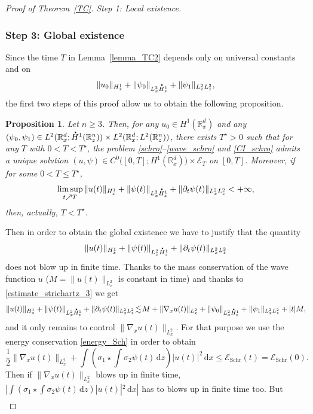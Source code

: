 \documentclass[10pt]{amsart}
\newtheorem{proposition}[lemma]{Proposition}
\theoremstyle{definition}
\newcommand*{\overbigdot}[1]{%
\accentset{\mbox{\large\bfseries .}}{#1}}
\newenvironment{ProofOf}[1]{\begin{proof}[Proof of #1]}{\end{proof}}
\newcommand{\R}{\mathbb{R}}
\newcommand{\ud}{\, {\mathrm{d}}}
\begin{document}
\begin{ProofOf}{Theorem~\ref{TC}. Step 1: Local existence}
\subsubsection*{Step 3: Global existence} Since the time $T$ in Lemma~\ref{lemma_TC2} depends only on universal constants and on\vspace*{-3pt}
\[
\|u_{0}\|_{H_{x}^{1}}+\|\psi_{0}\|_{L_{x}^{2}\overbigdot{H}_{z}^{1}}+\|\psi_{1}\|_{L_{x}^{2}L_{z}^{2}},
\]
the first two steps of this proof allow us to obtain the following proposition.
\begin{proposition}
Let $n\geq 3$. Then, for any $u_{0}\in H^{1}(\R_{x}^{d})$ and any $(\psi_{0},\psi_{1})\in L^{2}(\R_{x}^{d};\overbigdot{H}^{1}(\R_{z}^{n}))\times L^{2}(\R_{x}^{d};L^{2}(\R_{z}^{n}))$, there exists $T^{\star}>0$ such that for any $T$ with $0<T<T^{\star}$, the problem \eqref{schro}--\eqref{wave_schro} and \eqref{CI_schro} admits a unique solution \hbox{$(u,\psi)\in C^{0}\bigl([0,T];H^{1}(\R_{x}^{d})\bigr)\times\mathcal{E}_{T}$} on $[0,T]$. Moreover, if for some $0<T\leq T^{\star}$,
\[
\underset{t\nearrow T}{\limsup}\,\|u(t)\|_{H_{x}^{1}}+\|\psi(t)\|_{L_{x}^{2}\overbigdot{H}_{z}^{1}}+\|\partial_{t}\psi(t)\|_{L_{x}^{2}L_{z}^{2}}<+\infty,
\]
then, actually, $T<T^{\star}$.
\end{proposition}
Then in order to obtain the global existence we have to justify that the quantity
\[
\|u(t)\|_{H_{x}^{1}}+\|\psi(t)\|_{L_{x}^{2}\overbigdot{H}_{z}^{1}}+\|\partial_{t}\psi(t)\|_{L_{x}^{2}L_{z}^{2}}
\]
does not blow up in finite time. Thanks to the mass conservation of the wave function $u$ ($M=\|u(t)\|_{L_{x}^{2}}$ is constant in time) and thanks to \eqref{estimate_strichartz_3} we get
\[
\|u(t)\|_{H_{x}^{1}}+\|\psi(t)\|_{L_{x}^{2}\overbigdot{H}_{z}^{1}}+\|\partial_{t}\psi(t)\|_{L_{x}^{2}L_{z}^{2}}\!\lesssim\! M+\|\nabla_{x}u(t)\|_{L_{x}^{2}}+\|\psi_{0}\|_{L_{x}^{2}\overbigdot{H}_{z}^{1}}+\|\psi_{1}\|_{L_{x}^{2}L_{z}^{2}}+|t|M,
\]
and it only remains to control $\|\nabla_{x}u(t)\|_{L_{x}^{2}}$. For that purpose we use the energy conservation
\eqref{energy_Sch}
in order to obtain
\[
\frac{1}{2}\|\nabla_{x}u(t)\|_{L_{x}^{2}}+\int\left(\sigma_{1}\star\int\sigma_{2}\psi(t)\ud z\right)|u(t)|^{2}\ud x\leq \mathcal E_{\mathrm {Schr}}(t)= \mathcal E_{\mathrm {Schr}}(0).
\]
Then if $\|\nabla_{x}u(t)\|_{L_{x}^{2}}$ blows up in finite time, $|\int(\sigma_{1}\star\int\sigma_{2}\psi(t)\ud z)|u(t)|^{2}\ud x|$ has to blows up in finite time too. But
\begin{equation}\label{estimate_utile}
\begin{split}

\end{split}
\end{equation}
\end{ProofOf}
\end{document}
